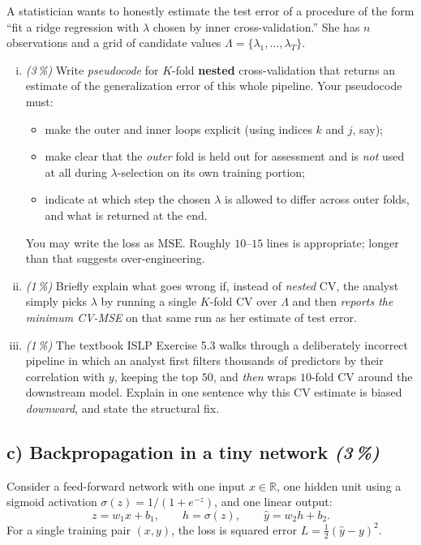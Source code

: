 \documentclass[11pt,a4paper]{article}
\newcommand{\subpoints}[1]{\textit{(#1\,\%)}}
\begin{document}
A statistician wants to honestly estimate the test error of a procedure of the form ``fit a ridge regression with $\lambda$ chosen by inner cross-validation.'' She has $n$ observations and a grid of candidate values $\Lambda = \{\lambda_1,\dots,\lambda_T\}$.

\begin{enumerate}[(i)]
  \item \subpoints{3} Write \emph{pseudocode} for $K$-fold \textbf{nested} cross-validation that returns an estimate of the generalization error of this whole pipeline. Your pseudocode must:
  \begin{itemize}
    \item make the outer and inner loops explicit (using indices $k$ and $j$, say);
    \item make clear that the \emph{outer} fold is held out for assessment and is \emph{not} used at all during $\lambda$-selection on its own training portion;
    \item indicate at which step the chosen $\lambda$ is allowed to differ across outer folds, and what is returned at the end.
  \end{itemize}
  You may write the loss as $\mathrm{MSE}$. Roughly $10$--$15$ lines is appropriate; longer than that suggests over-engineering.
  \item \subpoints{1} Briefly explain what goes wrong if, instead of \emph{nested} CV, the analyst simply picks $\lambda$ by running a single $K$-fold CV over $\Lambda$ and then \emph{reports the minimum CV-MSE} on that same run as her estimate of test error.
  \item \subpoints{1} The textbook ISLP Exercise 5.3 walks through a deliberately incorrect pipeline in which an analyst first filters thousands of predictors by their correlation with $y$, keeping the top $50$, and \emph{then} wraps $10$-fold CV around the downstream model. Explain in one sentence why this CV estimate is biased \emph{downward}, and state the structural fix.
\end{enumerate}

\subsection*{c) Backpropagation in a tiny network \subpoints{3}}

Consider a feed-forward network with one input $x\in\mathbb{R}$, one hidden unit using a sigmoid activation $\sigma(z)=1/(1+e^{-z})$, and one linear output:
$$z = w_1 x + b_1, \qquad h = \sigma(z), \qquad \hat y = w_2 h + b_2.$$
For a single training pair $(x,y)$, the loss is squared error $L = \tfrac{1}{2}(\hat y - y)^2$.
\end{document}
